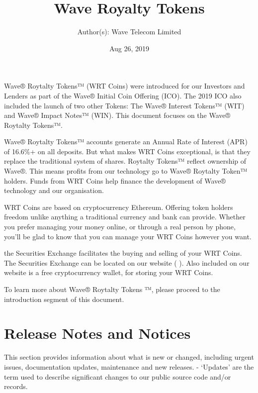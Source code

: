 \documentclass[letterpaper,10pt,openany,oneside,english]{sphinxmanual}
\title{Wave Royalty Tokens}
\date{Aug 26, 2019}
\author{Author(s): Wave Telecom Limited}
\begin{document}
\maketitle
\sphinxtableofcontents
{}\label{\detokenize{index::doc}}


Wave® Roytalty Tokens™ (WRT Coins) were introduced for our Investors and Lenders as part of the Wave® Initial Coin Offering (ICO).
The 2019 ICO also included the launch of two other Tokens: The Wave® Interest Tokens™ (WIT) and Wave® Impact Notes™ (WIN).
This document focuses on the Wave® Roytalty Tokens™.

Wave® Roytalty Tokens™ accounts generate an Annual Rate of Interest (APR) of 16.6\%+ on all deposits.
But what makes WRT Coins exceptional, is that they replace the traditional system of shares.
Roytalty Tokens™ reflect ownership of Wave®. This means profits from our technology go to Wave® Roytalty Token™ holders.
Funds from WRT Coins help finance the development of Wave® technology and our organisation.

WRT Coins are based on cryptocurrency Ethereum. Offering token holders freedom unlike anything a traditional currency and bank can provide.
Whether you prefer managing your money online, or through a real person by phone, you’ll be glad to know that you can manage your WRT Coins however you want.

the Securities Exchange facilitates the buying and selling of your WRT Coins.
The Securities Exchange can be located on our website (  ).
Also included on our website is a free cryptocurrency wallet, for storing your WRT Coins.

To learn more about Wave® Roytalty Tokens ™, please proceed to the introduction segment of this document.


\chapter{Release Notes and Notices}
\label{\detokenize{releasenotes:release-notes-and-notices}}\label{\detokenize{releasenotes::doc}}
This section provides information about what is new or changed, including urgent issues, documentation updates, maintenance and new releases.
- ‘Updates’ are the term used to describe significant changes to our public source code and/or records.
\end{document}
